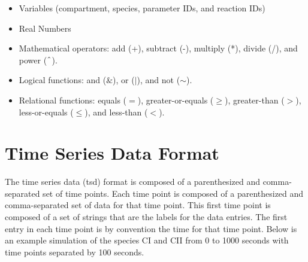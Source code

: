 \documentclass[titlepage,11pt]{article}
\begin{document}
\begin{itemize}
\item Variables (compartment, species, parameter IDs, and reaction IDs)
\item Real Numbers
\item Mathematical operators: add (+), subtract (-), multiply (*), divide (/), and power ($\char`\^$).
\item Logical functions: and ($\&$), or ($|$), and not ($\sim$).
\item Relational functions: equals ($=$), greater-or-equals ($\geq$), greater-than ($>$), less-or-equals ($\leq$), and less-than ($<$).
\end{itemize}

\section{\label{TSD}Time Series Data Format}

\noindent
The time series data (tsd) format is composed of a parenthesized and comma-separated set of time points. Each time point is composed of a parenthesized and comma-separated set of data for that time point. This first time point is composed of a set of strings that are the labels for the data entries. The first entry in each time point is by convention the time for that time point. Below is an example simulation of the species CI and CII from 0 to 1000 seconds with time points separated by 100 seconds. 
\end{document}
